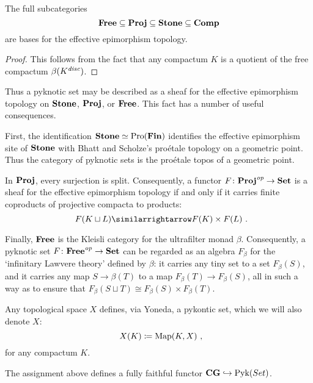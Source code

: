 \begin{lem}
	The full subcategories
	\[
		\textbf{\textup{Free}} \subseteq \textbf{\textup{Proj}} \subseteq \textbf{\textup{Stone}} \subseteq \textbf{\textup{Comp}}
	\]
	are bases for the effective epimorphism topology.
\end{lem}

\begin{proof}
	This follows from the fact that any compactum $ K $ is a quotient of the free compactum $ \beta(K^{\textit{disc}}) $.
\end{proof}

\begin{nul}
	Thus a pyknotic set may be described as a sheaf for the effective epimorphism topology on $ \textbf{\textup{Stone}} $, $ \textbf{\textup{Proj}} $, or $ \textbf{\textup{Free}} $.
	This fact has a number of useful consequences.

	First, the identification $ \textbf{\textup{Stone}} \simeq \operatorname{Pro}(\textbf{\textup{Fin}}) $ identifies the effective epimorphism site of $ \textbf{\textup{Stone}} $ with Bhatt and Scholze's proétale topology on a geometric point.
	Thus the category of pyknotic sets is the proétale topos of a geometric point.

	In $ \textbf{\textup{Proj}} $, every surjection is split.
	Consequently, a functor $ F \colon \textbf{\textup{Proj}}^{\textit{op}} \to \textbf{\textup{Set}} $ is a sheaf for the effective epimorphism topology if and only if it carries finite coproducts of projective compacta to products:
	\[
		F( K \sqcup L ) \equivalence F ( K ) \times F ( L ) \period
	\]

	Finally, $ \textbf{\textup{Free}} $ is the Kleisli category for the ultrafilter monad $ \beta $.
	Consequently, a pyknotic set $ F \colon \textbf{\textup{Free}}^{\textit{op}} \to \textbf{\textup{Set}} $ can be regarded as an algebra $ F_{\beta} $ for the `infinitary Lawvere theory' defined by $ \beta $:
	it carries any tiny set to a set $ F_{\beta}(S) $, and it carries any map $ S \to \beta(T) $ to a map $ F_{\beta}(T) \to F_{\beta}(S) $, all in such a way as to ensure that $ F_{\beta}(S \sqcup T) \cong F_{\beta}(S) \times F_{\beta}(T) $.
\end{nul}

\begin{exm}
	Any topological space $ X $ defines, via Yoneda, a pykontic set, which we will also denote $ X $:
	\[
		X(K) \coloneq \Map(K, X) \comma
	\]
	for any compactum $ K $.
\end{exm}

\begin{prp}
	The assignment above defines a fully faithful functor $ \textbf{\textup{CG}} \hookrightarrow \operatorname{Pyk}(Set) $.
\end{prp}

